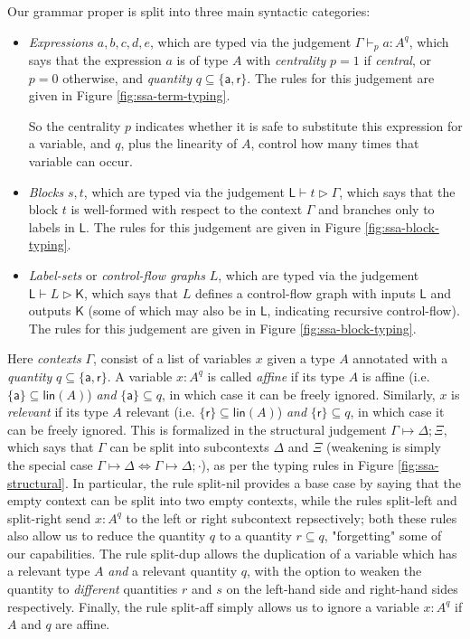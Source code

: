 \documentclass[acmsmall,screen,review]{acmart}
\newcommand{\ms}[1]{\ensuremath{\mathsf{#1}}}
\newcommand{\csplits}[3]{#1 \mapsto #2;#3}
\newcommand{\cwk}[2]{#1 \mapsto #2}
\newcommand{\tlin}[2]{#2 \subseteq \ms{lin}(#1)}
\newcommand{\rle}[1]{{\scriptsize\textsf{#1}}}
\newcommand{\taff}{{\{\ms{a}\}}}
\newcommand{\trel}{{\{\ms{r}\}}}
\newcommand{\tint}{{\{\ms{a}, \ms{r}\}}}
\newcommand{\hasty}[5]{#1 \vdash_{#2} #3: {#4}^{#5}}
\newcommand{\haslb}[3]{#1 \vdash #2 \rhd #3}
\newcommand{\lhaslb}[3]{#1 \vdash #2 \rhd #3}
\begin{document}
Our grammar proper is split into three main syntactic categories:
\begin{itemize}
  \item \textit{Expressions} \(a, b, c, d, e\), which are typed via the
  judgement \(\hasty{\Gamma}{p}{a}{A}{q}\), which says that the expression \(a\)
  is of type \(A\) with \textit{centrality} \(p = 1\) if \textit{central}, or \(p = 0\)
  otherwise, and \textit{quantity} \(q \subseteq \{\ms{a}, \ms{r}\}\). The rules
  for this judgement are given in Figure \ref{fig:ssa-term-typing}.

  So the centrality $p$ indicates whether it is safe to substitute this expression
  for a variable, and $q$, plus the linearity of $A$, control how many times that
  variable can occur. 
  
  \item \textit{Blocks} \(s, t\), which are typed via the judgement
  \(\haslb{\ms{L}}{t}{\Gamma}\), which says that the block \(t\) is well-formed
  with respect to the context \(\Gamma\) and branches only to labels in
  \(\ms{L}\). The rules for this judgement are given in Figure
  \ref{fig:ssa-block-typing}.

\item \textit{Label-sets} or \textit{control-flow graphs} \(L\), which are
  typed via the judgement \(\lhaslb{\ms{L}}{L}{\ms{K}}\), which says that \(L\)
  defines a control-flow graph with inputs \(\ms{L}\) and outputs \(\ms{K}\)
  (some of which may also be in \(\ms{L}\), indicating recursive control-flow).
  The rules for this judgement are given in Figure \ref{fig:ssa-block-typing}.
\end{itemize}
Here \textit{contexts} \(\Gamma\), consist of a list of variables \(x\) given a
type \(A\) annotated with a \textit{quantity} \(q \subseteq \tint\). A variable
\(x: A^q\) is called \textit{affine} if its type \(A\) is affine (i.e.
\(\tlin{A}{\taff}\)) \textit{and} \(\taff \subseteq q\), in which case it can be
freely ignored. Similarly, \(x\) is \textit{relevant} if its type \(A\) relevant
(i.e. \(\tlin{A}{\trel}\)) \textit{and} \(\trel \subseteq q\), in which case it
can be freely ignored. This is formalized in the structural judgement
\(\csplits{\Gamma}{\Delta}{\Xi}\), which says that \(\Gamma\) can be split into
subcontexts \(\Delta\) and \(\Xi\) (weakening is simply the special case
\(\cwk{\Gamma}{\Delta} \iff \csplits{\Gamma}{\Delta}{\cdot}\)), as per the
typing rules in Figure \ref{fig:ssa-structural}. In particular, the rule
\rle{split-nil} provides a base case by saying that the empty context can be
split into two empty contexts, while the rules \rle{split-left} and
\rle{split-right} send \(x: A^q\) to the left or right subcontext repsectively;
both these rules also allow us to reduce the quantity \(q\) to a quantity \(r
\subseteq q\), "forgetting" some of our capabilities. The rule \rle{split-dup}
allows the duplication of a variable which has a relevant type \(A\)
\textit{and} a relevant quantity \(q\), with the option to weaken the quantity
to \textit{different} quantities \(r\) and \(s\) on the left-hand side and
right-hand sides respectively. Finally, the rule \rle{split-aff} simply allows
us to ignore a variable \(x: A^q\) if \(A\) and \(q\) are affine.
\end{document}
